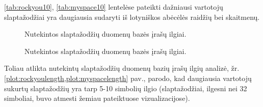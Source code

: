 \documentclass{VUMIFInfBakalaurinis}
\begin{document}
\ref{tab:rockyou10}, \ref{tab:myspace10} lentelėse pateikti dažniausi vartotojų 
slaptažodžiai yra daugiausia sudaryti iš lotyniškos abėcėlės raidžių bei 
skaitmenų.

\begin{figure}[!ht]
  \begin{center}
  \end{center}
  \caption{
    Nutekintos slaptažodžių duomenų bazės  įrašų ilgiai.
  }
  \label{plot:rockyoulength}
\end{figure}

\begin{figure}[!ht]
  \begin{center}
  \end{center}
  \caption{
    Nutekintos slaptažodžių duomenų bazės  įrašų ilgiai.
  }
  \label{plot:myspacelength}
\end{figure}

Toliau atlikta nutekintų slaptažodžių duomenų bazių įrašų ilgių analizė, žr. 
\ref{plot:rockyoulength,plot:myspacelength} pav., parodo, kad daugiausia 
vartotojų sukurtų slaptažodžių yra tarp 5-10 simbolių ilgio (slaptažodžiai, 
ilgesni nei 32 simboliai, buvo atmesti žemiau pateiktuose vizualizacijose).
\end{document}
